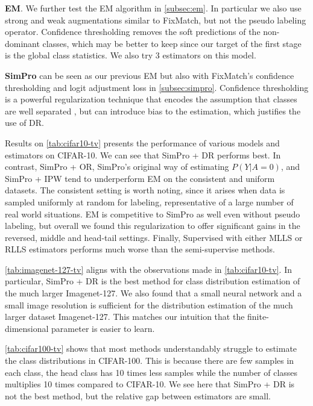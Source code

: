 \noindent\textbf{EM}. We further test the EM algorithm in \cref{subsec:em}. In particular we also use strong and weak augmentations similar to FixMatch, but not the pseudo labeling operator. Confidence thresholding removes the soft predictions of the non-dominant classes, which may be better to keep since our target of the first stage is the global class statistics. We also try 3 estimators on this model.

\noindent\textbf{SimPro} \cite{simpro} can be seen as our previous EM but also with FixMatch's confidence thresholding and logit adjustment loss in \cref{subsec:simpro}. Confidence thresholding is a powerful regularization technique that encodes the assumption that classes are well separated \cite{entropyminimization}, but can introduce bias to the estimation, which justifies the use of DR.



Results on \cref{tab:cifar10-tv} presents the performance of various models and estimators on CIFAR-10. We can see that SimPro + DR performs best. In contrast, SimPro + OR, SimPro's original way of estimating $P(Y|A=0)$, and SimPro + IPW tend to underperform EM on the consistent and uniform datasets. The consistent setting is worth noting, since it arises when data is sampled uniformly at random for labeling,  representative of a large number of real world situations. EM is competitive to SimPro as well even without pseudo labeling, but overall we found this regularization to offer significant gains in the reversed, middle and head-tail settings. Finally, Supervised with either MLLS or RLLS estimators performs much worse than the semi-supervise methods.

\cref{tab:imagenet-127-tv} aligns with the observations  made in \cref{tab:cifar10-tv}. In particular, SimPro + DR is the best method for class distribution estimation of the much larger Imagenet-127. We also found that a small neural network and a small image resolution is sufficient for the distribution estimation of the much larger dataset Imagenet-127. This matches our intuition that the finite-dimensional parameter is easier to learn.

\cref{tab:cifar100-tv} shows that most methods understandably struggle to estimate the class distributions in CIFAR-100. This is because there are few samples in each class, the head class has 10 times less samples while the number of classes multiplies 10 times compared to CIFAR-10. We see here that SimPro + DR is not the best method, but the relative gap between estimators are small.

